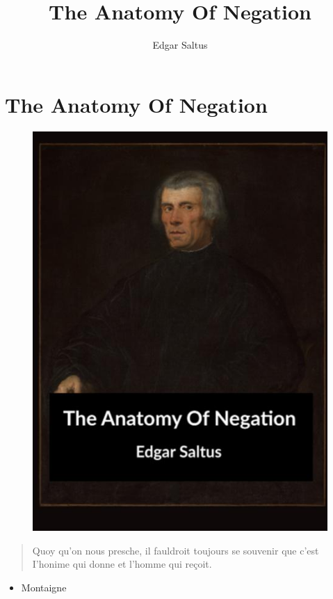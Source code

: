 \documentclass[]{book}
\title{The Anatomy Of Negation}
\author{Edgar Saltus}
\date{}
\providecommand{\tightlist}{%
  \setlength{\itemsep}{0pt}\setlength{\parskip}{0pt}}
\begin{document}
\maketitle

{
\setcounter{tocdepth}{1}
\tableofcontents
}
\chapter*{The Anatomy Of Negation}\label{the-anatomy-of-negation}

\begin{figure}
\centering
\includegraphics{./assets/h.jpg}
\caption{}
\end{figure}

\begin{quote}
Quoy qu'on nous presche, il fauldroit toujours se souvenir que c'est
I'honime qui donne et l'homme qui reçoit.
\end{quote}

\begin{itemize}
\tightlist
\item
  Montaigne
\end{itemize}
\end{document}
